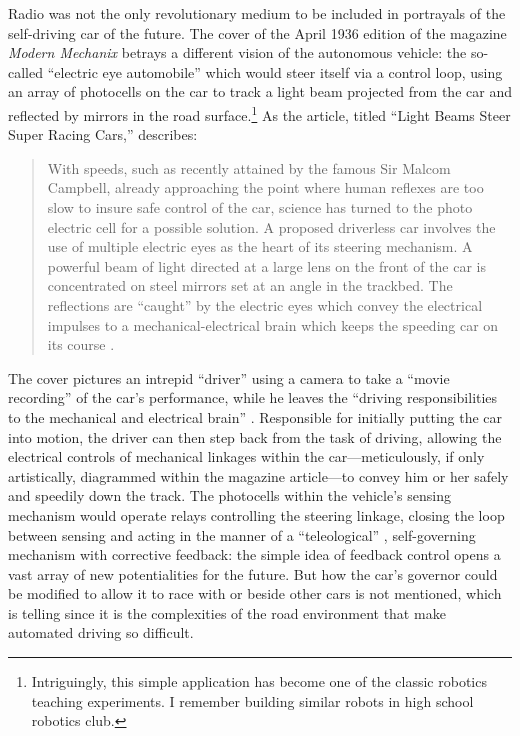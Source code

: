 Radio was not the only revolutionary medium to be included in
 portrayals of the self-driving car of the future. The cover of the
 April 1936 edition of the magazine \emph{Modern
   Mechanix} \cite{modernmechanix} betrays a 
 different vision of the autonomous vehicle: the so-called ``electric
 eye automobile'' which would steer itself via a control loop, using an
 array of photocells on the car to track a light
 beam projected from the car and reflected by mirrors in the road
 surface.\footnote{Intriguingly, this simple application has become
   one of the classic robotics teaching experiments. I remember
   building similar robots in high school robotics club.} As the article, titled ``Light Beams Steer Super Racing
 Cars,'' describes:
\begin{quote}
With speeds, such as recently attained by the famous Sir Malcom
Campbell, already approaching the point where human reflexes are too
slow to insure safe control of the car, science has turned to the
photo electric cell for a possible solution. A proposed driverless car
involves the use of multiple electric eyes as the heart of its
steering mechanism. A powerful beam of light directed at a large lens
on the front of the car is concentrated on steel mirrors set at an
angle in the trackbed. The reflections are ``caught'' by the electric
eyes which convey the electrical impulses to a mechanical-electrical
brain which keeps the speeding car on its course \cite[p. 71]{lightbeams}.
\end{quote}

The cover pictures an intrepid ``driver'' using a camera to take a
``movie recording'' of the car's performance, while he leaves the
``driving responsibilities to the mechanical and electrical brain''
\cite[p. 71]{lightbeams}.
Responsible for initially putting the car into motion, the driver can
then step back from the task of driving, allowing the electrical
controls of mechanical linkages within the car---meticulously, if only
artistically, diagrammed
within the magazine article---to convey him or her safely and speedily down
the track. The photocells within the vehicle's sensing mechanism would
operate relays controlling the steering linkage, closing the loop
between sensing and acting in the manner of a ``teleological''
\cite{behaviorPurpose}, 
self-governing mechanism with corrective feedback:  the simple
idea of feedback control opens a vast array of new potentialities for
the future. But how 
the car's governor could be modified to allow it to race with or
beside other cars is not mentioned, which is telling since it is the
complexities of the road environment that make automated driving so difficult.

